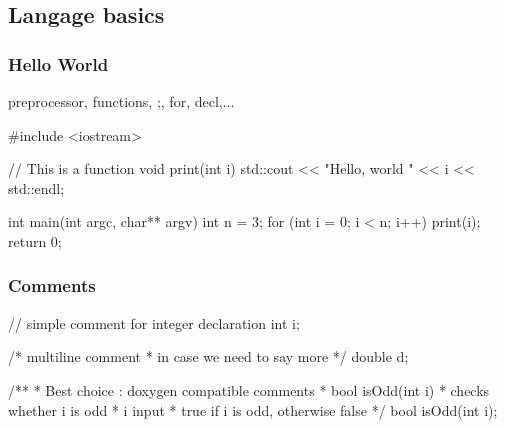 \subsection[Basics]{Langage basics}

\begin{frame}[fragile]
  \frametitle{Hello World}
  preprocessor, functions, ;, for, decl,...
  \begin{cppcode}
    #include <iostream>

    // This is a function
    void print(int i) {
      std::cout << "Hello, world " << i << std::endl;
    }

    int main(int argc, char** argv) {
      int n = 3;
      for (int i = 0; i < n; i++) {
        print(i);
      }
      return 0;
    }
  \end{cppcode}
\end{frame}

\begin{frame}[fragile]
  \frametitle{Comments}
  \begin{cppcode}
    // simple comment for integer declaration
    int i;

    /* multiline comment
     * in case we need to say more
     */
    double d;

    /**
     * Best choice : doxygen compatible comments
     * \fn bool isOdd(int i)
     * \brief checks whether i is odd
     * \param i input
     * \return true if i is odd, otherwise false
     */
     bool isOdd(int i);
  \end{cppcode}
\end{frame}

